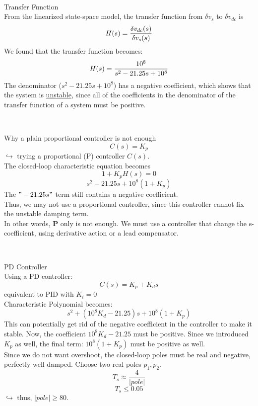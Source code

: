 \documentclass[12pt]{article}
\begin{document}
\

\begin{tcolorbox}[enhanced, frame hidden, colback=white, borderline west={1pt}{0pt}{gray}]
  \large{Transfer Function}\\
  \normalsize{}
  From the linearized state-space model, the transfer function from $\delta v_s$ to $\delta v_{dc}$ is \\
  \[
    \centering
    H(s) = \dfrac{\delta v_{dc}(s)}{\delta v_s(s)}
  \]
  We found that the transfer function becomes:\\
  \[
    \centering
    H(s) = \dfrac{10^8}{s^2 - 21.25s + 10^8}
  \]
  The denominator ($s^2 - 21.25s + 10^8$) has a negative coefficient, which shows that the system is \underline{unstable}, since all of the coefficients in the denominator of the transfer function of a system must be positive. 
\end{tcolorbox}

\

\begin{tcolorbox}[enhanced, frame hidden, colback=white, borderline west={1pt}{0pt}{gray}]
  \large{Why a plain proportional controller is not enough}
  \normalsize{}
  \[C(s) = K_p\]
  $\hookrightarrow$ trying a proportional (P) controller $C(s)$.\\

  The closed-loop characteristic equation becomes 
  \[
  1 + K_p H(s) = 0
  \]
  \[
  s^2 - 21.25s + 10^8(1+K_p)
  \]
  The $"-21.25s"$ term still contains a negative coefficient.\\
  Thus, we may not use a proportional controller, since this controller cannot fix the unstable damping term. \\
  
  In other words, \textbf{P} only is not enough. We must use a controller that change the s-coefficient, using derivative action or a lead compensator.
\end{tcolorbox}

\

\begin{tcolorbox}[enhanced, frame hidden, colback=white, borderline west={1pt}{0pt}{gray}]
  \large{PD Controller}\\
  \normalsize{}
  Using a PD controller:
  \[C(s) = K_p + K_ds\]
  equivalent to PID with $K_i = 0$\\

  Characteristic Polynomial becomes: 
  \[s^2 + (10^8 K_d -21.25)s + 10^8 (1+K_p)\]
  This can potentially get rid of the negative coefficient in the controller to make it stable. Now, the coefficient $10^8 K_d -21.25$ must be positive. Since we introduced $K_p$ as well, the final term: $10^8(1 + K_p)$ must be positive as well.\\

  Since we do not want overshoot, the closed-loop poles must be real and negative, perfectly well damped. Choose two real poles $p_1, p_2$.\\
  \[T_s \approx \dfrac{4}{|pole|}\]
  \[T_s \leq 0.05\]
  $\hookrightarrow$ thus, $|pole| \geq 80$.
\end{tcolorbox}
\end{document}
